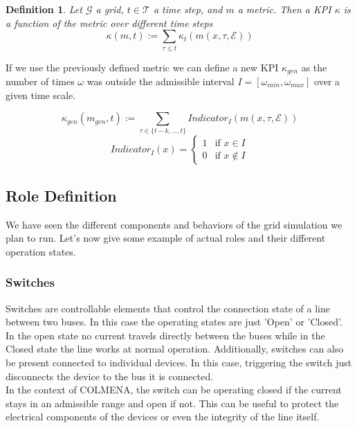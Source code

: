 \documentclass{report}
\newtheorem{definition}{Definition}
\begin{document}
\begin{definition}
    Let $\mathcal{G}$ a grid, $t \in \mathcal{T}$ a time step, and $m$ a metric. Then a KPI $\kappa$ is a function 
    of the metric over different time steps
    \begin{equation}
        \kappa(m, t) := \sum_{\tau \leq t} \kappa_t(m(x, \tau, \mathcal{E})) 
    \end{equation}
\end{definition}

If we use the previously defined metric we can define a new KPI $\kappa_{gen}$ as the number of times $\omega$ was outside the admissible interval $I=[\omega_{min}, \omega_{max}]$ over a given time scale.

\begin{equation}
    \kappa_{gen}(m_{gen}, t) := \sum_{\tau \in \{t-k, \dots,t\} } Indicator_I(m(x, \tau, \mathcal{E})) 
\end{equation}
\begin{equation}
    Indicator_I(x) = \begin{cases}
        1 & \text{if } x \in I \\
        0 & \text{if } x \notin I
    \end{cases}
\end{equation}
\subsection{Role Definition}

We have seen the different components and behaviors of the grid simulation we plan to run. Let's now give some example of actual roles and their different operation states. 

\subsubsection*{Switches}

Switches are controllable elements that control the connection state of a line 
between two buses. In this case the operating states are just 'Open' or 'Closed'.
In the open state no current travels directly between the buses while in the Closed
state the line works at normal operation. Additionally, switches can also be present connected to individual devices. 
In this case, triggering the switch just disconnects the device to the bus it is connected.\\

In the context of COLMENA, the switch can be operating closed if the current stays in an admissible range
and open if not. This can be useful to protect the electrical components of the devices or even the integrity of 
the line itself.\\
\end{document}
